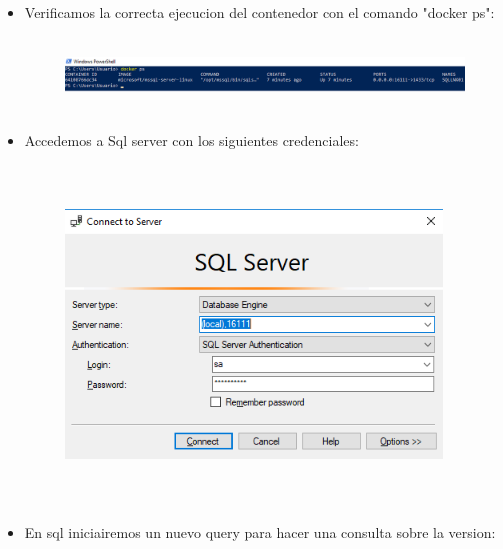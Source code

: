 \begin{itemize}
	\item Verificamos la correcta ejecucion del contenedor con el comando "docker ps":\\
	
	\begin{figure}[htb]
	\begin{center}
	\includegraphics[width=16cm, height=2cm]{./Imagenes/dockerps}
	\end{center}
	\end{figure}
	
	\item Accedemos a Sql server con los siguientes credenciales:\\
	
	\begin{figure}[htb]
	\begin{center}
	\includegraphics[width=10cm, height=9cm]{./Imagenes/sql}
	\end{center}
	\end{figure}
	
	\item En sql iniciairemos un nuevo query para hacer una consulta sobre la version:\\
	

\end{itemize}

